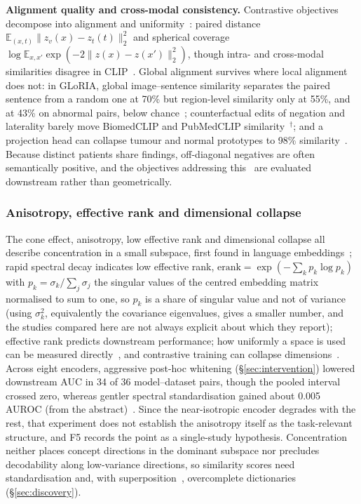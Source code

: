 \textbf{Alignment quality and cross-modal consistency.} Contrastive objectives decompose into
alignment and uniformity~\cite{wang2020understanding}: paired distance $\mathbb{E}_{(x,t)}\|z_v(x)-z_t(t)\|_2^{2}$ and spherical coverage
$\log\mathbb{E}_{x,x'}\exp(-2\|z(x)-z(x')\|_2^{2})$, though intra- and cross-modal similarities disagree in CLIP~\cite{mistretta2025cross}. Global
alignment survives where local alignment does not: in GLoRIA, global image--sentence similarity separates the
paired sentence from a random one at 70\% but region-level similarity only at 55\%, and at 43\% on abnormal
pairs, below chance~\cite{mcinerney2022that}; counterfactual edits of negation and laterality barely move
BiomedCLIP and PubMedCLIP similarity~\cite{balogh2026regularization}$^{\dagger}$; and a projection head can
collapse tumour and normal prototypes to 98\% similarity~\cite{arora2026semantic}. Because distinct patients
share findings, off-diagonal negatives are often semantically positive, and the objectives addressing
this~\cite{wang2022medclip,park2025off,zhang2025fane,ztrk2025meta} are evaluated downstream rather than
geometrically.

\subsubsection{Anisotropy, effective rank and dimensional collapse}

The cone effect, anisotropy, low effective rank and dimensional collapse all describe concentration
in a small subspace, first found in language embeddings~\cite{ethayarajh2019how}; rapid spectral decay
indicates low effective rank, $\mathrm{erank}=\exp(-\sum_k p_k\log p_k)$ with
$p_k=\sigma_k/\sum_j\sigma_j$ the singular values of the centred embedding matrix normalised to sum to
one, so $p_k$ is a share of singular value and not of variance (using $\sigma_k^2$, equivalently the
covariance eigenvalues, gives a smaller number, and the studies compared here are not always explicit about
which they report); effective rank predicts downstream performance; how uniformly a space is used can be measured
directly~\cite{rudman2022isoscore}, and contrastive training can collapse
dimensions~\cite{roy2007effective,garrido2022rankme,jing2021understanding,hassanpour2024overcoming}. Across
eight encoders, aggressive post-hoc whitening (\S\ref{sec:intervention}) lowered downstream AUC in
34 of 36 model--dataset pairs, though the pooled interval crossed zero, whereas gentler spectral
standardisation gained about 0.005 AUROC (from the abstract)~\cite{garciahidalgo2026embedding}. Since the
near-isotropic encoder degrades with the rest, that experiment does not establish the anisotropy itself as
the task-relevant structure, and F5 records the point as a single-study hypothesis. Concentration
neither places concept directions in the dominant subspace nor precludes decodability along
low-variance directions, so similarity scores need standardisation and, with
superposition~\cite{elhage2022toy}, overcomplete dictionaries (\S\ref{sec:discovery}).

